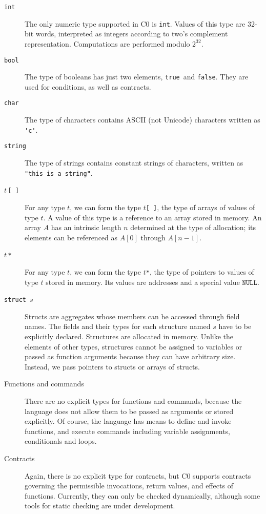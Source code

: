 \documentclass[11pt]{article}
\newcommand{\tint}{\texttt{int}}
\newcommand{\tbool}{\texttt{bool}}
\newcommand{\vtrue}{\texttt{true}}
\newcommand{\vfalse}{\texttt{false}}
\newcommand{\tstring}{\texttt{string}}
\newcommand{\tchar}{\texttt{char}}
\newcommand{\tarray}{\texttt{[\,]}}
\newcommand{\tstar}{\texttt{*}}
\newcommand{\vnull}{\texttt{NULL}}
\newcommand{\tstruct}{\texttt{struct}}
\begin{document}
\begin{description}
\item[\tint] The only numeric type supported in C0 is \tint.  Values of
  this type are 32-bit words, interpreted as integers according to
  two's complement representation.  Computations are performed
  modulo $2^{32}$.
\item[\tbool] The type of booleans has just two elements, \vtrue\ and \vfalse.
  They are used for conditions, as well as contracts.
\item[\tchar] The type of characters contains ASCII (not Unicode)
  characters written as \verb!'c'!.
\item[\tstring] The type of strings contains constant strings of
  characters, written as \verb'"this is a string"'.
\item[$t$\,\tarray] For any type $t$, we can form the type $t$\tarray,
  the type of arrays of values of type $t$.  A value of this type is a
  reference to an array stored in memory.  An array $A$ has an
  intrinsic length $n$ determined at the type of allocation; its
  elements can be referenced as $A[0]$ through $A[n-1]$.
\item[$t$\,\tstar] For any type $t$, we can form the type $t$\tstar, the
  type of pointers to values of type $t$ stored in memory.  Its values
  are addresses and a special value $\vnull$.
\item[\tstruct\ $s$] Structs are aggregates whose members can be
  accessed through field names.  The fields and their types for each
  structure named $s$ have to be explicitly declared.  Structures are
  allocated in memory.  Unlike the elements of other types, structures
  cannot be assigned to variables or passed as function arguments
  because they can have arbitrary size.  Instead, we pass pointers to
  structs or arrays of structs.
\item[Functions and commands] There are no explicit types for
  functions and commands, because the language does not allow them to
  be passed as arguments or stored explicitly.  Of course, the
  language has means to define and invoke functions, and execute
  commands including variable assignments, conditionals and loops.
\item[Contracts] Again, there is no explicit type for contracts,
  but C0 supports contracts governing the permissible invocations,
  return values, and effects of functions.  Currently, they can only
  be checked dynamically, although some tools for static checking
  are under development.
\end{description}
\end{document}
